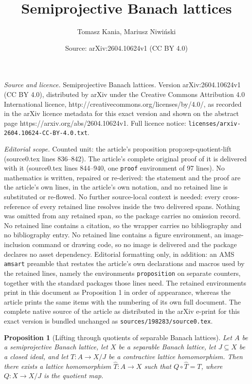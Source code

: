 \documentclass[10pt,a4paper]{amsart}
\title{Semiprojective Banach lattices}
\author{Tomasz Kania, Mariusz Niwi\'nski}
\date{Source: arXiv:2604.10624v1 (CC BY 4.0)}
\newtheorem{proposition}{Proposition}
\begin{document}
\maketitle

\noindent\emph{Source and licence.} Semiprojective Banach lattices. Version arXiv:2604.10624v1 (CC BY 4.0), distributed by arXiv under the Creative Commons Attribution 4.0 International licence, http://creativecommons.org/licenses/by/4.0/, as recorded in the arXiv licence metadata for this exact version and shown on the abstract page https://arxiv.org/abs/2604.10624v1. Full licence notice: \texttt{licenses/arxiv-2604.10624-CC-BY-4.0.txt}.\par\smallskip

\noindent\textit{Editorial scope.} Counted unit: the article's proposition prop:sep-quotient-lift (source0.tex lines 836--842). The article's complete original proof of it is delivered with it (source0.tex lines 844--940, one \texttt{proof} environment of 97 lines). No mathematics is written, repaired or re-derived: the statement and the proof are the article's own lines, in the article's own notation, and no retained line is substituted or re-flowed.  No further source-local context is needed: every cross-reference of every retained line resolves inside the two delivered spans.  Nothing was omitted from any retained span, so the package carries no omission record.  No retained line contains a citation, so the wrapper carries no bibliography and no bibliography entry.  No retained line contains a figure environment, an image-inclusion command or drawing code, so no image is delivered and the package declares no asset dependency.  Editorial formatting only, in addition: an AMS \texttt{amsart} preamble that restates the article's own declarations and macros used by the retained lines, namely the environments \texttt{proposition} on separate counters, together with the standard packages those lines need.  The retained environments print in this document as Proposition 1 in order of appearance, whereas the article prints the same items with the numbering of its own full document.  The complete native source of the article as distributed in the arXiv e-print for this exact version is bundled unchanged as \texttt{sources/198283/source0.tex}.
\begin{proposition}[Lifting through quotients of separable Banach lattices]\label{prop:sep-quotient-lift}
Let $A$ be a semiprojective Banach lattice, let $X$ be a separable Banach lattice,
let $J\subseteq X$ be a closed ideal, and let
$T\colon A\to X/J$ be a contractive lattice homomorphism.
Then there exists a lattice homomorphism $\widehat T\colon A\to X$ such that
$Q\circ \widehat T=T$, where $Q\colon X\to X/J$ is the quotient map.
\end{proposition}
\end{document}
